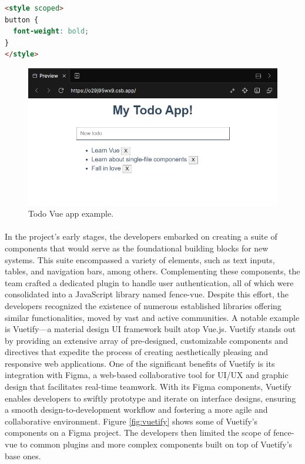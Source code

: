 \begin{lstlisting}[language=HTML, caption=Vue.js style code., label=lst:vue-style]
<style scoped>
button {
  font-weight: bold;
}
</style>
\end{lstlisting}
\begin{figure}[H]
    \centering
    \includegraphics[width=0.8\linewidth]{figuras/todo-app.png}
    \caption{Todo Vue app example.}
    \label{fig:todo-app}
\end{figure}



\paragraph{} In the project's early stages, the developers embarked on creating a suite of components that would serve as the foundational building blocks for new systems. This suite encompassed a variety of elements, such as text inputs, tables, and navigation bars, among others. Complementing these components, the team crafted a dedicated plugin to handle user authentication, all of which were consolidated into a JavaScript library named fence-vue. Despite this effort, the developers recognized the existence of numerous established libraries offering similar functionalities, moved by vast and active communities. A notable example is Vuetify—a material design UI framework built atop Vue.js. Vuetify stands out by providing an extensive array of pre-designed, customizable components and directives that expedite the process of creating aesthetically pleasing and responsive web applications. One of the significant benefits of Vuetify is its integration with Figma, a web-based collaborative tool for UI/UX and graphic design that facilitates real-time teamwork. With its Figma components, Vuetify enables developers to swiftly prototype and iterate on interface designs, ensuring a smooth design-to-development workflow and fostering a more agile and collaborative environment. Figure \ref{fig:vuetify} shows some of Vuetify's components on a Figma project. The developers then limited the scope of fence-vue to common plugins and more complex components built on top of Vuetify's base ones.


